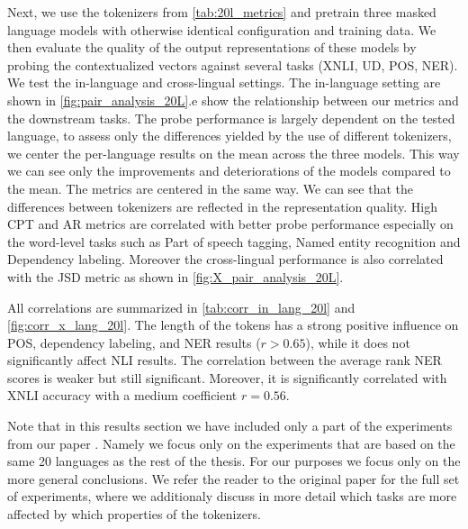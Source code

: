 Next, we use the tokenizers from \autoref{tab:20l_metrics} and pretrain three masked language models with otherwise identical configuration and training data. We then evaluate the quality of the output representations of these models by probing the contextualized vectors against several tasks (XNLI, UD, POS, NER). We test the in-language and cross-lingual settings. The in-language setting are shown in \autoref{fig:pair_analysis_20L}.e show the relationship between our metrics and the downstream tasks. The probe performance is largely dependent on the tested language, to assess only the differences yielded by the use of different tokenizers, we center the per-language results on the mean across the three models. This way we can see only the improvements and deteriorations of the models compared to the mean. The metrics are centered in the same way. We can see that the differences between tokenizers are reflected in the representation quality. High CPT and AR metrics are correlated with better probe performance especially on the word-level tasks such as Part of speech tagging, Named entity recognition and Dependency labeling. Moreover the cross-lingual performance is also correlated with the JSD metric as shown in \autoref{fig:X_pair_analysis_20L}.


All correlations are summarized in \autoref{tab:corr_in_lang_20l} and \autoref{fig:corr_x_lang_20l}. The length of the tokens has a strong positive influence on POS, dependency labeling, and NER results ($r > 0.65$), while it does not significantly affect NLI results. The correlation between the average rank NER scores is weaker but still significant. Moreover, it is significantly correlated with XNLI accuracy with a medium coefficient $r = 0.56$. 


Note that in this results section we have included only a part of the experiments from our paper \citet{limisiewicz_tokenization_2023}. Namely we focus only on the experiments that are based on the same 20 languages as the rest of the thesis. For our purposes we focus only on the more general conclusions. We refer the reader to the original paper for the full set of experiments, where we additionaly discuss in more detail which tasks are more affected by which properties of the tokenizers.


